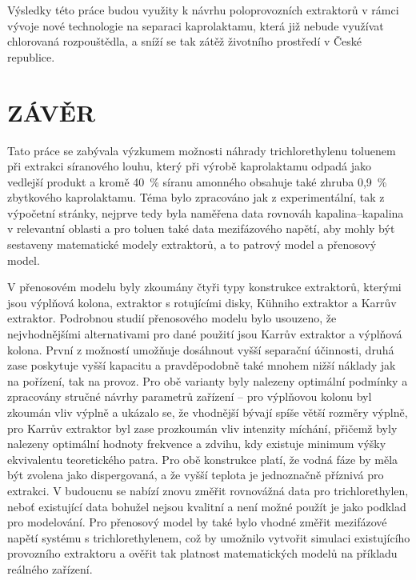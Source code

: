 \documentclass[a4paper, 12pt]{article}
\begin{document}
Výsledky této práce budou využity k návrhu poloprovozních extraktorů v rámci vývoje nové technologie na separaci kaprolaktamu, která již nebude využívat chlorovaná rozpouštědla, a sníží se tak zátěž životního prostředí v České republice.










\newpage \section{ZÁVĚR} \label{conclusions}
Tato práce se zabývala výzkumem možnosti náhrady trichlorethylenu toluenem při extrakci síranového louhu, který při výrobě kaprolaktamu odpadá jako vedlejší produkt a kromě 40~\% síranu amonného obsahuje také zhruba 0,9~\% zbytkového kaprolaktamu.
Téma bylo zpracováno jak z experimentální, tak z výpočetní stránky, nejprve tedy byla naměřena data rovnováh kapalina--kapalina v relevantní oblasti a pro toluen také data mezifázového napětí, aby mohly být sestaveny matematické modely extraktorů, a to patrový model a přenosový model.

V přenosovém modelu byly zkoumány čtyři typy konstrukce extraktorů, kterými jsou výplňová kolona, extraktor s rotujícími disky, Kühniho extraktor a Karrův extraktor.
Podrobnou studií přenosového modelu bylo usouzeno, že nejvhodnějšími alternativami pro dané použití jsou Karrův extraktor a výplňová kolona.
První z možností umožňuje dosáhnout vyšší separační účinnosti, druhá zase poskytuje vyšší kapacitu a pravděpodobně také mnohem nižší náklady jak na pořízení, tak na provoz.
Pro obě varianty byly nalezeny optimální podmínky a zpracovány stručné návrhy parametrů zařízení -- pro výplňovou kolonu byl zkoumán vliv výplně a ukázalo se, že vhodnější bývají spíše větší rozměry výplně, pro Karrův extraktor byl zase prozkoumán vliv intenzity míchání, přičemž byly nalezeny optimální hodnoty frekvence a zdvihu, kdy existuje minimum výšky ekvivalentu teoretického patra.
Pro obě konstrukce platí, že vodná fáze by měla být zvolena jako dispergovaná, a že vyšší teplota je jednoznačně příznivá pro extrakci.
V budoucnu se nabízí znovu změřit rovnovážná data pro trichlorethylen, neboť existující data bohužel nejsou kvalitní a není možné použít je jako podklad pro modelování.
Pro přenosový model by také bylo vhodné změřit mezifázové napětí systému s trichlorethylenem, což by umožnilo vytvořit simulaci existujícího provozního extraktoru a ověřit tak platnost matematických modelů na příkladu reálného zařízení. 
\end{document}
